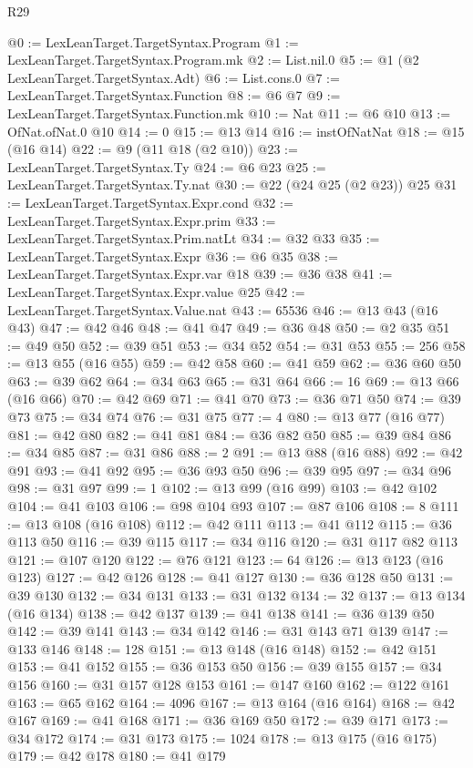 \begin{lexlean}{R29}
\begin{coremodule}
@0 := LexLeanTarget.TargetSyntax.Program
@1 := LexLeanTarget.TargetSyntax.Program.mk
@2 := List.nil.{0}
@5 := @1 (@2 LexLeanTarget.TargetSyntax.Adt)
@6 := List.cons.{0}
@7 := LexLeanTarget.TargetSyntax.Function
@8 := @6 @7
@9 := LexLeanTarget.TargetSyntax.Function.mk
@10 := Nat
@11 := @6 @10
@13 := OfNat.ofNat.{0} @10
@14 := 0
@15 := @13 @14
@16 := instOfNatNat
@18 := @15 (@16 @14)
@22 := @9 (@11 @18 (@2 @10))
@23 := LexLeanTarget.TargetSyntax.Ty
@24 := @6 @23
@25 := LexLeanTarget.TargetSyntax.Ty.nat
@30 := @22 (@24 @25 (@2 @23)) @25
@31 := LexLeanTarget.TargetSyntax.Expr.cond
@32 := LexLeanTarget.TargetSyntax.Expr.prim
@33 := LexLeanTarget.TargetSyntax.Prim.natLt
@34 := @32 @33
@35 := LexLeanTarget.TargetSyntax.Expr
@36 := @6 @35
@38 := LexLeanTarget.TargetSyntax.Expr.var @18
@39 := @36 @38
@41 := LexLeanTarget.TargetSyntax.Expr.value @25
@42 := LexLeanTarget.TargetSyntax.Value.nat
@43 := 65536
@46 := @13 @43 (@16 @43)
@47 := @42 @46
@48 := @41 @47
@49 := @36 @48
@50 := @2 @35
@51 := @49 @50
@52 := @39 @51
@53 := @34 @52
@54 := @31 @53
@55 := 256
@58 := @13 @55 (@16 @55)
@59 := @42 @58
@60 := @41 @59
@62 := @36 @60 @50
@63 := @39 @62
@64 := @34 @63
@65 := @31 @64
@66 := 16
@69 := @13 @66 (@16 @66)
@70 := @42 @69
@71 := @41 @70
@73 := @36 @71 @50
@74 := @39 @73
@75 := @34 @74
@76 := @31 @75
@77 := 4
@80 := @13 @77 (@16 @77)
@81 := @42 @80
@82 := @41 @81
@84 := @36 @82 @50
@85 := @39 @84
@86 := @34 @85
@87 := @31 @86
@88 := 2
@91 := @13 @88 (@16 @88)
@92 := @42 @91
@93 := @41 @92
@95 := @36 @93 @50
@96 := @39 @95
@97 := @34 @96
@98 := @31 @97
@99 := 1
@102 := @13 @99 (@16 @99)
@103 := @42 @102
@104 := @41 @103
@106 := @98 @104 @93
@107 := @87 @106
@108 := 8
@111 := @13 @108 (@16 @108)
@112 := @42 @111
@113 := @41 @112
@115 := @36 @113 @50
@116 := @39 @115
@117 := @34 @116
@120 := @31 @117 @82 @113
@121 := @107 @120
@122 := @76 @121
@123 := 64
@126 := @13 @123 (@16 @123)
@127 := @42 @126
@128 := @41 @127
@130 := @36 @128 @50
@131 := @39 @130
@132 := @34 @131
@133 := @31 @132
@134 := 32
@137 := @13 @134 (@16 @134)
@138 := @42 @137
@139 := @41 @138
@141 := @36 @139 @50
@142 := @39 @141
@143 := @34 @142
@146 := @31 @143 @71 @139
@147 := @133 @146
@148 := 128
@151 := @13 @148 (@16 @148)
@152 := @42 @151
@153 := @41 @152
@155 := @36 @153 @50
@156 := @39 @155
@157 := @34 @156
@160 := @31 @157 @128 @153
@161 := @147 @160
@162 := @122 @161
@163 := @65 @162
@164 := 4096
@167 := @13 @164 (@16 @164)
@168 := @42 @167
@169 := @41 @168
@171 := @36 @169 @50
@172 := @39 @171
@173 := @34 @172
@174 := @31 @173
@175 := 1024
@178 := @13 @175 (@16 @175)
@179 := @42 @178
@180 := @41 @179

\end{coremodule}
\end{lexlean}
